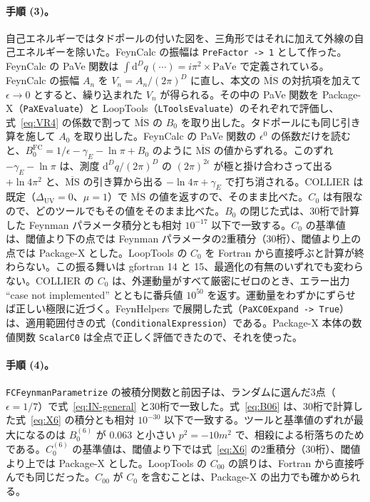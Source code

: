\documentclass[a4paper,10pt]{ltjsarticle}
\newcommand{\dd}{\mathrm{d}}
\begin{document}
\paragraph{手順 (3)。}自己エネルギーではタドポールの付いた図を、三角形ではそれに加えて外線の自己エネルギーを除いた。FeynCalc の振幅は \texttt{PreFactor -> 1} として作った。FeynCalc の PaVe 関数は $\int\dd^Dq\,(\cdots)=i\pi^2\times\mathrm{PaVe}$ で定義されている。FeynCalc の振幅 $A_n$ を $V_n=A_n/(2\pi)^D$ に直し、本文の $\overline{\mathrm{MS}}$ の対抗項を加えて $\epsilon\to0$ とすると、繰り込まれた $V_n$ が得られる。その中の PaVe 関数を Package-X（\texttt{PaXEvaluate}）と LoopTools（\texttt{LToolsEvaluate}）のそれぞれで評価し、式~\eqref{eq:VR4} の係数で割って $\overline{\mathrm{MS}}$ の $B_0$ を取り出した。タドポールにも同じ引き算を施して $A_0$ を取り出した。FeynCalc の PaVe 関数の $\epsilon^0$ の係数だけを読むと、$B_0^{\mathrm{FC}}=1/\epsilon-\gamma_E-\ln\pi+B_0$ のように $\overline{\mathrm{MS}}$ の値からずれる。このずれ $-\gamma_E-\ln\pi$ は、測度 $\dd^Dq/(2\pi)^D$ の $(2\pi)^{2\epsilon}$ が極と掛け合わさって出る $+\ln4\pi^2$ と、$\overline{\mathrm{MS}}$ の引き算から出る $-\ln4\pi+\gamma_E$ で打ち消される。COLLIER は既定（$\Delta_{\mathrm{UV}}=0$、$\mu=1$）で $\overline{\mathrm{MS}}$ の値を返すので、そのまま比べた。$C_0$ は有限なので、どのツールでもその値をそのまま比べた。$B_0$ の閉じた式は、30桁で計算した Feynman パラメータ積分とも相対 $10^{-17}$ 以下で一致する。$C_0$ の基準値は、閾値より下の点では Feynman パラメータの2重積分（30桁）、閾値より上の点では Package-X とした。LoopTools の $C_0$ を Fortran から直接呼ぶと計算が終わらない。この振る舞いは gfortran 14 と 15、最適化の有無のいずれでも変わらない。COLLIER の $C_0$ は、外運動量がすべて厳密にゼロのとき、エラー出力 ``case not implemented'' とともに番兵値 $10^{50}$ を返す。運動量をわずかにずらせば正しい極限に近づく。FeynHelpers で展開した式（\texttt{PaXC0Expand -> True}）は、適用範囲付きの式（\texttt{ConditionalExpression}）である。Package-X 本体の数値関数 \texttt{ScalarC0} は全点で正しく評価できたので、それを使った。

\paragraph{手順 (4)。}\texttt{FCFeynmanParametrize} の被積分関数と前因子は、ランダムに選んだ3点（$\epsilon=1/7$）で式~\eqref{eq:IN-general} と30桁で一致した。式~\eqref{eq:B06} は、30桁で計算した式~\eqref{eq:X6} の積分とも相対 $10^{-30}$ 以下で一致する。ツールと基準値のずれが最大になるのは $B_0^{(6)}$ が $0.063$ と小さい $p^2=-10m^2$ で、相殺による桁落ちのためである。$C_0^{(6)}$ の基準値は、閾値より下では式~\eqref{eq:X6} の2重積分（30桁）、閾値より上では Package-X とした。LoopTools の $C_{00}$ の誤りは、Fortran から直接呼んでも同じだった。$C_{00}$ が $C_0$ を含むことは、Package-X の出力でも確かめられる。
\end{document}
